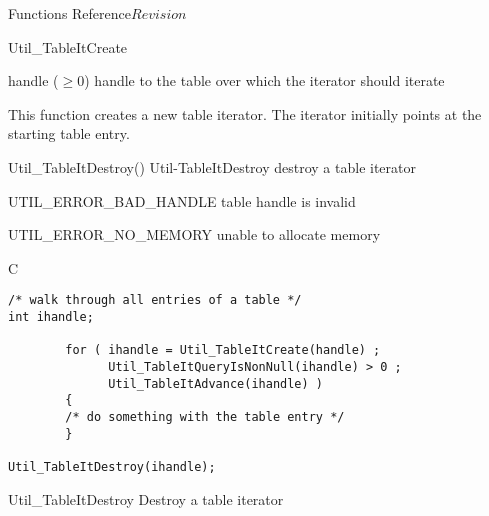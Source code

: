 \begin{cactuspart}{ Functions Reference}{}{$Revision$}
\begin{FunctionDescription}{Util\_TableItCreate}
\begin{ParameterSection}
\begin{Parameter}{handle ($\ge 0$)}
handle to the table over which the iterator should iterate
\end{Parameter}
\end{ParameterSection}

\begin{Discussion}
This function creates a new table iterator.  The iterator initially
points at the starting table entry.
\end{Discussion}

\begin{SeeAlsoSection}
\begin{SeeAlso2} {Util\_TableItDestroy()} {Util-TableItDestroy}
destroy a table iterator
\end{SeeAlso2}
\end{SeeAlsoSection}

\begin{ErrorSection}
\begin{Error}{UTIL\_ERROR\_BAD\_HANDLE}
table handle is invalid
\end{Error}
\begin{Error}{UTIL\_ERROR\_NO\_MEMORY}
unable to allocate memory
\end{Error}
\end{ErrorSection}

\begin{ExampleSection}
\begin{Example}{C}
\begin{verbatim}
/* walk through all entries of a table */
int ihandle;

        for ( ihandle = Util_TableItCreate(handle) ;
              Util_TableItQueryIsNonNull(ihandle) > 0 ;
              Util_TableItAdvance(ihandle) )
        {
        /* do something with the table entry */
        }

Util_TableItDestroy(ihandle);
\end{verbatim}
\end{Example}
\end{ExampleSection}
\end{FunctionDescription}


\begin{FunctionDescription}{Util\_TableItDestroy}
\label{Util-TableItDestroy}
Destroy a table iterator


\end{FunctionDescription}
\end{cactuspart}
